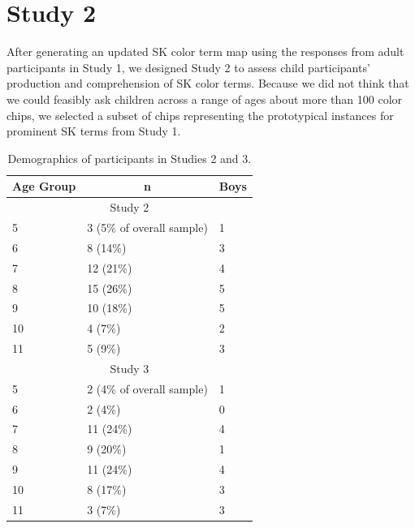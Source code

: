\documentclass[
  english,
  ,apa7,floatsintext]{apa6}
\begin{document}
\hypertarget{study-2}{%
\section{Study 2}\label{study-2}}

After generating an updated SK color term map using the responses from adult participants in Study 1, we designed Study 2 to assess child participants' production and comprehension of SK color terms. Because we did not think that we could feasibly ask children across a range of ages about more than 100 color chips, we selected a subset of chips representing the prototypical instances for prominent SK terms from Study 1.

\begin{table}[tbp]

\begin{center}
\begin{threeparttable}

\caption{\label{tab:study23-demographics}Demographics of participants in Studies 2 and 3.}

\begin{tabular}{lll}
\toprule
Age Group & \multicolumn{1}{c}{n} & \multicolumn{1}{c}{Boys}\\
\midrule
\multicolumn{3}{c}{Study 2}\\
5 & 3 (5\% of overall sample) & 1\\
6 & 8 (14\%) & 3\\
7 & 12 (21\%) & 4\\
8 & 15 (26\%) & 5\\
9 & 10 (18\%) & 5\\
10 & 4 (7\%) & 2\\
11 & 5 (9\%) & 3\\
\multicolumn{3}{c}{Study 3}\\
5 & 2 (4\% of overall sample) & 1\\
6 & 2 (4\%) & 0\\
7 & 11 (24\%) & 4\\
8 & 9 (20\%) & 1\\
9 & 11 (24\%) & 4\\
10 & 8 (17\%) & 3\\
11 & 3 (7\%) & 3\\
\bottomrule
\end{tabular}

\end{threeparttable}
\end{center}

\end{table}
\end{document}
